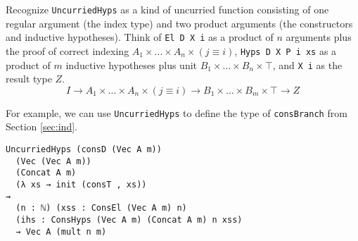 \documentclass[preprint,nonatbib]{sigplanconf}
\newcommand{\refsec}[1]{Section \ref{sec:#1}}
\begin{document}
Recognize {\tt UncurriedHyps} as a kind of uncurried function
consisting of one regular argument (the index type) and two product
arguments (the constructors and inductive hypotheses). 
Think of
{\tt El D X i} as a product of $n$ arguments plus the proof of correct
indexing $A_1 × ... × A_n × (j≡i)$, {\tt Hyps D X P i xs} as a
product of $m$ inductive hypotheses plus unit $B_1 × ... × B_n × ⊤$,
and {\tt X i} as the result type $Z$.
\[
I → A_1 × ... × A_n × (j ≡ i) → B_1 × ... × B_m × ⊤ → Z
\]

For example, we can use {\tt UncurriedHyps} to define the type of
{\tt consBranch} from \refsec{ind}.

\begin{verbatim}
UncurriedHyps (consD (Vec A m))
  (Vec (Vec A m))
  (Concat A m)
  (λ xs → init (consT , xs))
⇝
  (n : ℕ) (xss : ConsEl (Vec A m) n)
  (ihs : ConsHyps (Vec A m) (Concat A m) n xss)
  → Vec A (mult n m)
\end{verbatim}







\end{document}
